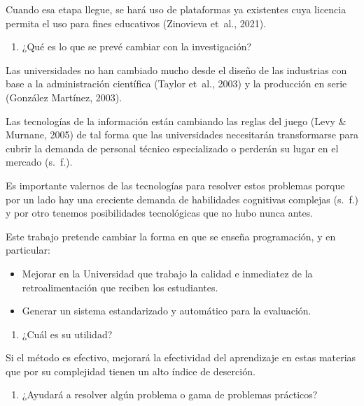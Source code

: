 \documentclass[
  12,
]{scrartcl}
\providecommand{\tightlist}{%
  \setlength{\itemsep}{0pt}\setlength{\parskip}{0pt}}
\begin{document}
Cuando esa etapa llegue, se hará uso de plataformas ya existentes cuya
licencia permita el uso para fines educativos (Zinovieva et~al., 2021).

\begin{enumerate}
\def\labelenumi{\arabic{enumi}.}
\setcounter{enumi}{3}
\tightlist
\item
  ¿Qué es lo que se prevé cambiar con la investigación?
\end{enumerate}

Las universidades no han cambiado mucho desde el diseño de las
industrias con base a la administración científica (Taylor et~al., 2003)
y la producción en serie (González Martínez, 2003).

Las tecnologías de la información están cambiando las reglas del juego
(Levy \& Murnane, 2005) de tal forma que las universidades necesitarán
transformarse para cubrir la demanda de personal técnico especializado o
perderán su lugar en el mercado (s.~f.).

Es importante valernos de las tecnologías para resolver estos problemas
porque por un lado hay una creciente demanda de habilidades cognitivas
complejas (s.~f.) y por otro tenemos posibilidades tecnológicas que no
hubo nunca antes.

Este trabajo pretende cambiar la forma en que se enseña programación, y
en particular:

\begin{itemize}
\item
  Mejorar en la Universidad que trabajo la calidad e inmediatez de la
  retroalimentación que reciben los estudiantes.
\item
  Generar un sistema estandarizado y automático para la evaluación.
\end{itemize}

\begin{enumerate}
\def\labelenumi{\arabic{enumi}.}
\setcounter{enumi}{4}
\tightlist
\item
  ¿Cuál es su utilidad?
\end{enumerate}

Si el método es efectivo, mejorará la efectividad del aprendizaje en
estas materias que por su complejidad tienen un alto índice de
deserción.

\begin{enumerate}
\def\labelenumi{\arabic{enumi}.}
\setcounter{enumi}{5}
\tightlist
\item
  ¿Ayudará a resolver algún problema o gama de problemas prácticos?
\end{enumerate}
\end{document}
